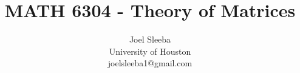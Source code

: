 \documentclass[12pt]{report}
\theoremstyle{plain} %
\theoremstyle{definition} %
\theoremstyle{remark} %
\begin{document}
    \title{MATH 6304 - Theory of Matrices}

    \author{
      Joel Sleeba \\
      University of Houston \\
      joelsleeba1@gmail.com \\
    }

    \maketitle

     \setcounter{page}{2}
    \tableofcontents
     \setcounter{page}{1}

    
    
    
    


    \printbibliography[heading=bibintoc]
\end{document}

